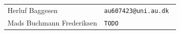 \clearpage
\maketitle
\vspace{9cm}
\begin{tabular}{l l}
    Herluf Baggesen & \tt{au607423@uni.au.dk} \\
    Mads Buchmann Frederiksen & \tt{TODO} \\
\end{tabular}
\thispagestyle{empty} %
\begin{bottom}

\end{bottom}
\pagebreak
\setcounter{page}{1}
